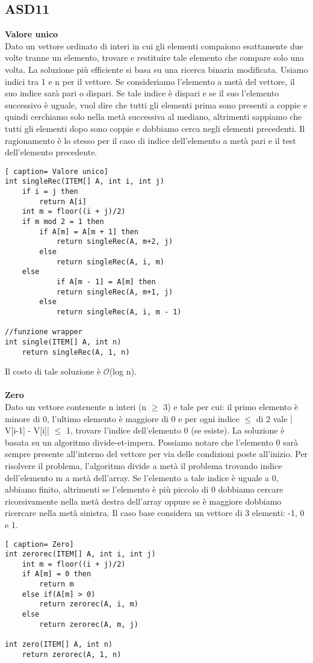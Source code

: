 \documentclass[../cheatSheetAlgoritmi.tex]{subfiles}
\begin{document}
\subsection{ASD11}
\textbf{Valore unico}\\
Dato un vettore ordinato di interi in cui gli elementi compaiono esattamente due volte tranne un elemento, trovare e restituire tale elemento che compare solo una volta. La soluzione più efficiente si basa su una ricerca binaria modificata. Usiamo indici tra 1 e n per il vettore. Se consideriamo l'elemento a metà del vettore, il suo indice sarà pari o dispari. Se tale indice è dispari e se il suo l'elemento successivo è uguale, vuol dire che tutti gli elementi prima sono presenti a coppie e quindi cerchiamo solo nella  metà successiva al mediano, altrimenti sappiamo che tutti gli elementi dopo sono coppie e dobbiamo cerca negli elementi precedenti. Il ragionamento è lo stesso per il caso di indice dell'elemento a metà pari e il test dell'elemento precedente.
 
\begin{lstlisting}[ caption= Valore unico]
int singleRec(ITEM[] A, int i, int j)
	if i = j then
		return A[i]
	int m = floor((i + j)/2)
	if m mod 2 = 1 then
		if A[m] = A[m + 1] then
			return singleRec(A, m+2, j)
		else
			return singleRec(A, i, m)
	else
			if A[m - 1] = A[m] then
			return singleRec(A, m+1, j)
		else
			return singleRec(A, i, m - 1)
			
//funzione wrapper
int single(ITEM[] A, int n)
	return singleRec(A, 1, n)
\end{lstlisting}
Il costo di tale soluzione è $\mathcal{O}$(log n).\\\\
\textbf{Zero}\\
Dato un vettore contenente n interi (n $\geq$ 3) e tale per cui: il primo elemento è minore di 0, l'ultimo elemento è maggiore di 0 e per ogni indice $\leq$ di 2 vale | V[i-1] - V[i]| $\leq$ 1, trovare l'indice dell'elemento 0 (se esiste). La soluzione è basata su un algoritmo divide-et-impera. Possiamo notare che l'elemento 0 sarà sempre presente all'interno del vettore per via delle condizioni poste all'inizio. Per risolvere il problema, l'algoritmo divide a metà il problema trovando indice dell'elemento m a metà dell'array. Se l'elemento a tale indice è uguale a 0, abbiamo finito, altrimenti se l'elemento è più piccolo di 0 dobbiamo cercare ricorsivamente nella metà destra dell'array oppure se è maggiore dobbiamo ricercare nella metà sinistra. Il caso base considera un vettore di 3 elementi: -1, 0 e 1.
 
\begin{lstlisting}[ caption= Zero]
int zerorec(ITEM[] A, int i, int j)
	int m = floor((i + j)/2)
	if A[m] = 0 then
		return m
	else if(A[m] > 0)
		return zerorec(A, i, m)
	else
		return zerorec(A, m, j)
			
int zero(ITEM[] A, int n)
	return zerorec(A, 1, n)
\end{lstlisting}

\newpage
\end{document}
